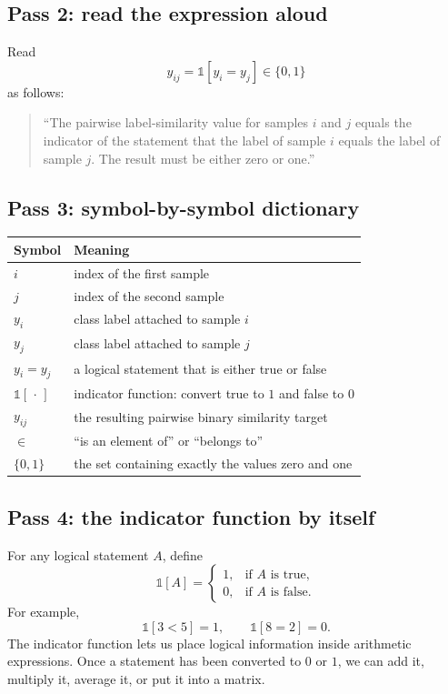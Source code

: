 \documentclass[11pt,oneside,openany]{book}
\theoremstyle{myplain}
\theoremstyle{definition}
\newcommand{\ind}{\mathds{1}}
\begin{document}
\subsection{Pass 2: read the expression aloud}

Read
\[
  y_{ij}=\ind[y_i=y_j]\in\{0,1\}
\]
as follows:

\begin{quote}
``The pairwise label-similarity value for samples $i$ and $j$ equals the indicator of the statement that the label of sample $i$ equals the label of sample $j$. The result must be either zero or one.''
\end{quote}

\subsection{Pass 3: symbol-by-symbol dictionary}

\begin{center}
\begin{tabularx}{\textwidth}{>{\bfseries}l X}
\toprule
Symbol & Meaning \\
\midrule
$i$ & index of the first sample \\
$j$ & index of the second sample \\
$y_i$ & class label attached to sample $i$ \\
$y_j$ & class label attached to sample $j$ \\
$y_i=y_j$ & a logical statement that is either true or false \\
$\ind[\,\cdot\,]$ & indicator function: convert true to $1$ and false to $0$ \\
$y_{ij}$ & the resulting pairwise binary similarity target \\
$\in$ & ``is an element of'' or ``belongs to'' \\
$\{0,1\}$ & the set containing exactly the values zero and one \\
\bottomrule
\end{tabularx}
\end{center}

\subsection{Pass 4: the indicator function by itself}

For any logical statement $A$, define
\[
\ind[A]=
\begin{cases}
1,&\text{if $A$ is true},\\
0,&\text{if $A$ is false}.
\end{cases}
\]
For example,
\[
\ind[3<5]=1,\qquad
\ind[8=2]=0.
\]
The indicator function lets us place logical information inside arithmetic expressions. Once a statement has been converted to $0$ or $1$, we can add it, multiply it, average it, or put it into a matrix.
\end{document}
